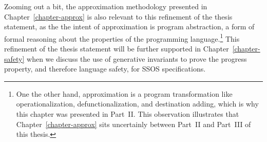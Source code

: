 \noindent
Zooming out a bit, the approximation methodology presented in
Chapter~\ref{chapter-approx} is also relevant to this refinement of
the thesis statement, as the the intent of approximation is program
abstraction, a form of formal reasoning about the properties of the
programming language.\footnote{One the other hand, approximation is a
  program transformation like operationalization, defunctionalization,
  and destination adding, which is why this chapter was presented in
  Part~II. This observation illustrates that
  Chapter~\ref{chapter-approx} sits uncertainly between Part~II and
  Part~III of this thesis.} This refinement of the thesis statement
will be further supported in Chapter~\ref{chapter-safety} when we
discuss the use of generative invariants to prove the progress
property, and therefore language safety, for SSOS specifications.











